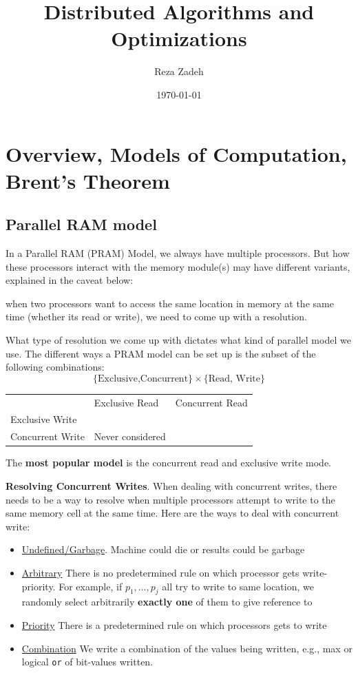 \documentclass[11pt]{article}
\author{Reza Zadeh}
\date{\today}
\title{Distributed Algorithms and Optimizations}
\begin{document}
\maketitle
\tableofcontents


\section{Overview, Models of Computation, Brent's Theorem}
\label{sec:org435d4a1}
\subsection{Parallel RAM model}
\label{sec:orgf5716d1}
In a Parallel RAM (PRAM) Model, we always have multiple processors. But how these processors
interact with the memory module(s) may have different variants, explained in the caveat below:

\begin{center}
when two processors want to access the same location in memory at the same time (whether its
read or write), we need to come up with a resolution.
\end{center}

What type of resolution we come up with dictates what kind of parallel model we use. The
different ways a PRAM model can be set up is the subset of the following combinations:
\begin{equation*}
\{\text{Exclusive,Concurrent}\}\times\{\text{Read, Write}\}
\end{equation*}

\begin{center}
\begin{tabular}{lll}
 & Exclusive Read & Concurrent Read\\
Exclusive Write &  & \\
Concurrent Write & Never considered & \\
\end{tabular}
\end{center}

The \textbf{most popular model} is the concurrent read and exclusive write mode.

\textbf{Resolving Concurrent Writes}. When dealing with concurrent writes, there needs to be a way to
 resolve when multiple processors attempt to write to the same memory cell at the same time.
 Here are the ways to deal with concurrent write:
\begin{itemize}
\item \uline{Undefined/Garbage}. Machine could die or results could be garbage
\item \uline{Arbitrary} There is no predetermined rule on which processor gets write-priority. For example,
if \(p_1,\dots,p_j\) all try to write to same location, we randomly select arbitrarily \textbf{exactly one}
of them to give reference to
\item \uline{Priority} There is a predetermined rule on which processors gets to write
\item \uline{Combination} We write a combination of the values being written, e.g., max or logical \texttt{or} of
bit-values written.
\end{itemize}
\end{document}
